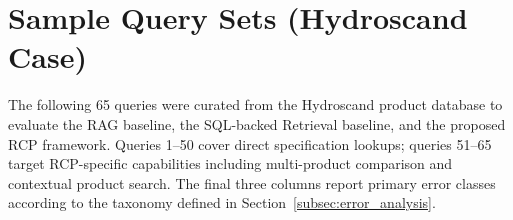 

\section{Sample Query Sets (Hydroscand Case)}
\label{appendix:query_sets}

The following 65 queries were curated from the Hydroscand product database to evaluate the RAG baseline, the SQL-backed Retrieval baseline, and the proposed RCP framework. Queries 1--50 cover direct specification lookups; queries 51--65 target RCP-specific capabilities including multi-product comparison and contextual product search. The final three columns report primary error classes according to the taxonomy defined in Section~\ref{subsec:error_analysis}.

\small
{}
\setlength{\tabcolsep}{2pt}
\renewcommand{\arraystretch}{1.1}

